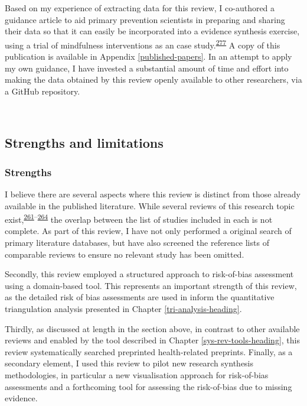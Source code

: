 \documentclass[a4paper, twoside]{templates/ociamthesis}
\begin{document}
Based on my experience of extracting data for this review, I co-authored a guidance article to aid primary prevention scientists in preparing and sharing their data so that it can easily be incorporated into a evidence synthesis exercise, using a trial of mindfulness interventions as an case study.\textsuperscript{\protect\hyperlink{ref-hennessy2021}{277}} A copy of this publication is available in Appendix \ref{published-papers}. In an attempt to apply my own guidance, I have invested a substantial amount of time and effort into making the data obtained by this review openly available to other researchers, via a GitHub repository.

~

\hypertarget{strengths-and-limitations}{%
\subsection{Strengths and limitations}\label{strengths-and-limitations}}

\hypertarget{strengths}{%
\subsubsection{Strengths}\label{strengths}}

I believe there are several aspects where this review is distinct from those already available in the published literature. While several reviews of this research topic exist,\textsuperscript{\protect\hyperlink{ref-chu2018}{261}--\protect\hyperlink{ref-poly2020}{264}} the overlap between the list of studies included in each is not complete. As part of this review, I have not only performed a original search of primary literature databases, but have also screened the reference lists of comparable reviews to ensure no relevant study has been omitted.

Secondly, this review employed a structured approach to risk-of-bias assessment using a domain-based tool. This represents an important strength of this review, as the detailed risk of bias assessments are used in inform the quantitative triangulation analysis presented in Chapter \ref{tri-analysis-heading}.

Thirdly, as discussed at length in the section above, in contrast to other available reviews and enabled by the tool described in Chapter \ref{sys-rev-tools-heading}, this review systematically searched preprinted health-related preprints. Finally, as a secondary element, I used this review to pilot new research synthesis methodologies, in particular a new visualisation approach for risk-of-bias assessments and a forthcoming tool for assessing the risk-of-bias due to missing evidence.
\end{document}
